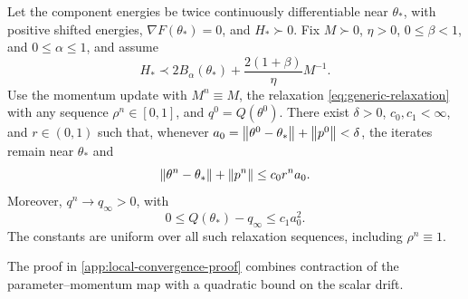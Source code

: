 \begin{theorem}
\label{thm:local-relaxed-convergence}
Let the component energies be twice continuously differentiable near
\(\theta_*\), with positive shifted energies,
\(\nabla F(\theta_*)=0\), and \(H_*\succ0\). Fix
\(M\succ0\), \(\eta>0\), \(0\leq\beta<1\), and
\(0\leq\alpha\leq1\), and assume
\begin{equation}
  H_*\prec2B_\alpha(\theta_*)+
  \frac{2(1+\beta)}{\eta}M^{-1}.
  \label{eq:local-relaxed-stability-condition}
\end{equation}
Use the momentum update with \(M^n\equiv M\), the relaxation
\cref{eq:generic-relaxation} with any sequence \(\rho^n\in[0,1]\), and
\(q^0=Q(\theta^0)\). There exist \(\delta>0\), \(c_0,c_1<\infty\),
and \(r\in(0,1)\) such that, whenever
\(a_0=\left\lVert\theta^0-\theta_*\right\rVert+\left\lVert p^0\right\rVert<\delta\), the iterates remain
near \(\theta_*\) and
\begin{equation}
  \left\lVert\theta^n-\theta_*\right\rVert+\left\lVert p^n\right\rVert\leq c_0r^na_0.
  \label{eq:local-geometric-convergence}
\end{equation}
Moreover, \(q^n\to q_\infty>0\), with
\begin{equation}
  0\leq Q(\theta_*)-q_\infty\leq c_1a_0^2.
  \label{eq:local-scalar-limit}
\end{equation}
The constants are uniform over all such relaxation sequences, including
\(\rho^n\equiv1\).
\end{theorem}

The proof in \cref{app:local-convergence-proof} combines contraction of the
parameter--momentum map with a quadratic bound on the scalar drift.
